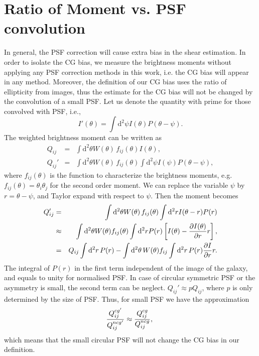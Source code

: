 \documentclass[useAMS,usenatbib]{mn2e}
\renewcommand{\d}{\mathrm{d}}
\newcommand{\bea}{\begin{eqnarray}}
\newcommand{\eea}{\end{eqnarray}}
\newcommand{\be}{\begin{equation}}
\newcommand{\ee}{\end{equation}}
\newcommand{\eck}[1]{\left[ #1 \right]}
\begin{document}
\section{Ratio of Moment vs. PSF convolution}
In general, the PSF correction will cause extra bias in the shear
estimation. In order to isolate the CG bias, we measure the
brightness moments without applying any PSF correction methods in this
work, i.e. the CG bias will appear in any method.  Moreover, the
definition of our CG bias uses the ratio of ellipticity from images,
thus the estimate for the CG bias will not be changed by the
convolution of a small PSF. Let us denote the quantity with prime for
those convolved with PSF, i.e.,
%
\be
I'(\theta) = \int \d^2 \psi I(\theta) P(\theta-\psi).
\ee
%
The weighted brightness moment can be written as
%
\bea
Q_{ij} &=& \int \d^2 \theta W(\theta)\, f_{ij}(\theta) I(\theta ),\\
Q_{ij}' &=& \int \d^2 \theta W(\theta)\, f_{ij}(\theta)\int \d^2\psi I(\psi) P(\theta-\psi),
\eea
%
where $f_{ij}(\theta)$ is the function to characterize the brightness
moments, e.g. $f_{ij}(\theta)=\theta_i\theta_j$ for the second order
moment. We can replace the variable $\psi$ by $r=\theta-\psi$, and
Taylor expand with respect to $\psi$. Then the moment becomes
%
\bea
Q_{ij}' &=& \int \d^2 \theta W(\theta)\, f_{ij}(\theta) \int \d^2r I(\theta-r) P(r)\\
&\approx &\int \d^2 \theta W(\theta) f_{ij}(\theta) \int \d^2r P(r) \eck{I(\theta)-{\partial I(\theta) \over \partial r}r}, \nonumber \\
&=&Q_{ij} \int \d^2r\,P(r) - \int \d^2\theta\, W(\theta) f_{ij} \int \d^2r\, P(r) {\partial I\over \partial r}r.\nonumber
\eea
%
The integral of $P(r)$ in the first term independent of the image of
the galaxy, and equals to unity for normalised PSF. In case of
circular symmetric PSF or the asymmetry is small, the second term can
be neglect. $Q_{ij}'\approx p Q_{ij}$, where $p$ is only determined
by the size of PSF. Thus, for small PSF we have the approximation
%
\be
{Q^{cg'}_{ij} \over Q^{ncg'}_{ij}} \approx
{Q^{cg}_{ij} \over Q^{ncg}_{ij}}, \;
\ee
%
which means that the small circular PSF will not change the CG bias in
our definition.
%
%



\end{document}
